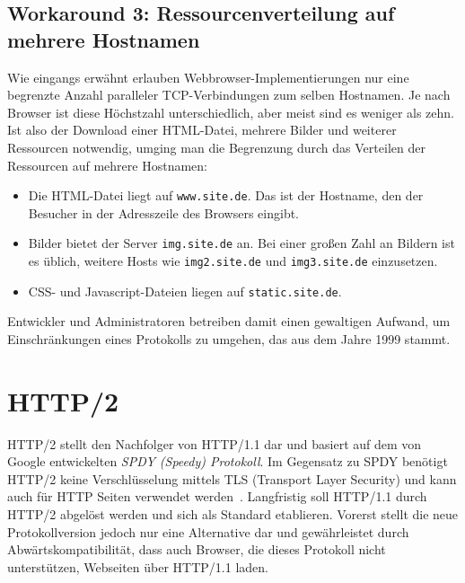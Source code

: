 \documentclass[a4paper, justified, notoc]{tufte-handout} %
\begin{document}
\subsection{Workaround 3: Ressourcenverteilung auf mehrere Hostnamen} %
\label{sub:verteilung_von_ressourcen_auf_mehrere_hostnamen}

Wie eingangs erwähnt erlauben Webbrowser-Implementierungen nur eine begrenzte Anzahl paralleler TCP-Verbindungen zum selben Hostnamen. Je nach Browser ist diese Höchstzahl unterschiedlich, aber meist sind es weniger als zehn. Ist also der Download einer HTML-Datei, mehrere Bilder und weiterer Ressourcen notwendig, umging man die Begrenzung durch das Verteilen der Ressourcen auf mehrere Hostnamen:

\begin{itemize}
	\item Die HTML-Datei liegt auf \texttt{www.site.de}. Das ist der Hostname, den der Besucher in der Adresszeile des Browsers eingibt.
	\item Bilder bietet der Server \texttt{img.site.de} an. Bei einer großen Zahl an Bildern ist es üblich, weitere Hosts wie \texttt{img2.site.de} und \texttt{img3.site.de} einzusetzen.
	\item CSS- und Javascript-Dateien liegen auf \texttt{static.site.de}.
\end{itemize}
Entwickler und Administratoren betreiben damit einen gewaltigen Aufwand, um Einschränkungen eines Protokolls zu umgehen, das aus dem Jahre 1999 stammt.




\section{HTTP/2} %
\label{sec:http_2}

HTTP/2 stellt den Nachfolger von HTTP/1.1 dar und basiert auf dem von Google entwickelten \emph{SPDY (Speedy) Protokoll}. Im Gegensatz zu SPDY benötigt HTTP/2 keine Verschlüsselung mittels TLS (Transport Layer Security) und kann auch für HTTP Seiten verwendet werden~\citep{mueller:2015}. Langfristig soll HTTP/1.1 durch HTTP/2 abgelöst werden und sich als Standard etablieren. Vorerst stellt die neue Protokollversion jedoch nur eine Alternative dar und gewährleistet durch Abwärtskompatibilität, dass auch Browser, die dieses Protokoll nicht unterstützen, Webseiten über HTTP/1.1 laden.
\end{document}
